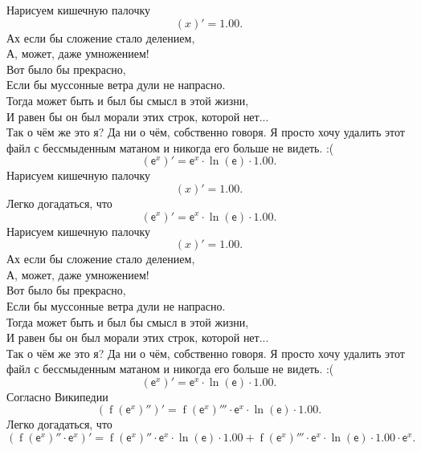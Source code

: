 \documentclass[a4paper,oneside,final,12pt,russian]{extarticle}
\newcommand{\e}{\mathsf{e}}
\begin{document}
Нарисуем кишечную палочку
\begin{dmath*}
(x )' = 1.00 .
\end{dmath*}
Ах если бы сложение стало делением, \\ 
А, может, даже умножением! \\ 
Вот было бы прекрасно,\\ 
Если бы муссонные ветра дули не напрасно. \\ 
Тогда может быть и был бы смысл в этой жизни,\\ 
И равен бы он был морали этих строк, которой нет...\\ 
Так о чём же это я? Да ни о чём, собственно говоря.
Я просто хочу удалить этот файл с бессмыденным матаном 
и никогда его больше не видеть. :(
\begin{dmath*}
(\e ^{x } )' = \e ^{x } \cdot \operatorname{ln}(\e ) \cdot 1.00 .
\end{dmath*}
Нарисуем кишечную палочку
\begin{dmath*}
(x )' = 1.00 .
\end{dmath*}
Легко догадаться, что
\begin{dmath*}
(\e ^{x } )' = \e ^{x } \cdot \operatorname{ln}(\e ) \cdot 1.00 .
\end{dmath*}
Нарисуем кишечную палочку
\begin{dmath*}
(x )' = 1.00 .
\end{dmath*}
Ах если бы сложение стало делением, \\ 
А, может, даже умножением! \\ 
Вот было бы прекрасно,\\ 
Если бы муссонные ветра дули не напрасно. \\ 
Тогда может быть и был бы смысл в этой жизни,\\ 
И равен бы он был морали этих строк, которой нет...\\ 
Так о чём же это я? Да ни о чём, собственно говоря.
Я просто хочу удалить этот файл с бессмыденным матаном 
и никогда его больше не видеть. :(
\begin{dmath*}
(\e ^{x } )' = \e ^{x } \cdot \operatorname{ln}(\e ) \cdot 1.00 .
\end{dmath*}
Согласно Википедии
\begin{dmath*}
(\operatorname{f}(\e ^{x } ) '')' = \operatorname{f}(\e ^{x } ) '''\cdot \e ^{x } \cdot \operatorname{ln}(\e ) \cdot 1.00 .
\end{dmath*}
Легко догадаться, что
\begin{dmath*}
(\operatorname{f}(\e ^{x } ) ''\cdot \e ^{x } )' = \operatorname{f}(\e ^{x } ) ''\cdot \e ^{x } \cdot \operatorname{ln}(\e ) \cdot 1.00 + \operatorname{f}(\e ^{x } ) '''\cdot \e ^{x } \cdot \operatorname{ln}(\e ) \cdot 1.00 \cdot \e ^{x } .
\end{dmath*}
\end{document}
